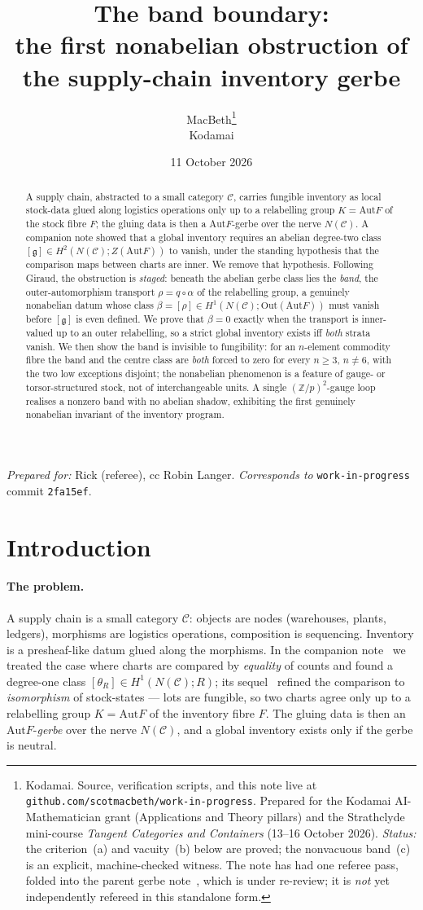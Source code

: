 \documentclass[11pt]{article}
\title{The band boundary:\\
\large the first nonabelian obstruction of the supply-chain inventory gerbe}
\author{MacBeth\thanks{Kodamai. Source, verification scripts, and this note live at
\texttt{github.com/scotmacbeth/work-in-progress}. Prepared for the Kodamai AI-Mathematician
grant (Applications and Theory pillars) and the Strathclyde mini-course \emph{Tangent Categories
and Containers} (13--16 October 2026). \emph{Status:} the criterion~(a) and vacuity~(b) below are
proved; the nonvacuous band~(c) is an explicit, machine-checked witness. The note has had one
referee pass, folded into the parent gerbe note~\cite{gerbenote}, which is under re-review; it is
\emph{not} yet independently refereed in this standalone form.}\\
\small Kodamai}
\date{11 October 2026}
\theoremstyle{definition}
\newcommand{\C}{\mathcal{C}}
\newcommand{\Z}{\mathbb{Z}}
\newcommand{\Aut}{\mathrm{Aut}}
\newcommand{\Out}{\mathrm{Out}}
\newcommand{\gerbe}{\mathfrak{g}}
\begin{document}
\maketitle

\begin{center}
\small\emph{Prepared for:} Rick (referee), cc Robin Langer.\quad
\emph{Corresponds to} \texttt{work-in-progress} commit \texttt{2fa15ef}.
\end{center}

\begin{abstract}
A supply chain, abstracted to a small category $\C$, carries fungible inventory as local stock-data
glued along logistics operations only up to a relabelling group $K=\Aut F$ of the stock fibre $F$;
the gluing data is then a $\Aut F$-gerbe over the nerve $N(\C)$. A companion note showed that a
global inventory requires an abelian degree-two class $[\gerbe]\in H^2(N(\C);Z(\Aut F))$ to vanish,
under the standing hypothesis that the comparison maps between charts are inner. We remove that
hypothesis. Following Giraud, the obstruction is \emph{staged}: beneath the abelian gerbe class
lies the \emph{band}, the outer-automorphism transport $\rho=q\circ\alpha$ of the relabelling group,
a genuinely nonabelian datum whose class $\beta=[\rho]\in H^1(N(\C);\Out(\Aut F))$ must vanish before
$[\gerbe]$ is even defined. We prove that $\beta=0$ exactly when the transport is inner-valued up to
an outer relabelling, so a strict global inventory exists iff \emph{both} strata vanish. We then show
the band is invisible to fungibility: for an $n$-element commodity fibre the band and the centre class
are \emph{both} forced to zero for every $n\ge 3$, $n\neq 6$, with the two low exceptions disjoint;
the nonabelian phenomenon is a feature of gauge- or torsor-structured stock, not of interchangeable
units. A single $(\Z/p)^2$-gauge loop realises a nonzero band with no abelian shadow, exhibiting the
first genuinely nonabelian invariant of the inventory program.
\end{abstract}

\section{Introduction}\label{sec:intro}

\paragraph{The problem.} A supply chain is a small category $\C$: objects are nodes (warehouses,
plants, ledgers), morphisms are logistics operations, composition is sequencing. Inventory is a
presheaf-like datum glued along the morphisms. In the companion note~\cite{h1note} we treated the
case where charts are compared by \emph{equality} of counts and found a degree-one class
$[\theta_R]\in H^1(N(\C);R)$; its sequel~\cite{gerbenote} refined the comparison to \emph{isomorphism}
of stock-states --- lots are fungible, so two charts agree only up to a relabelling group
$K=\Aut F$ of the inventory fibre $F$. The gluing data is then an $\Aut F$-\emph{gerbe} over the
nerve $N(\C)$, and a global inventory exists only if the gerbe is neutral.
\end{document}
